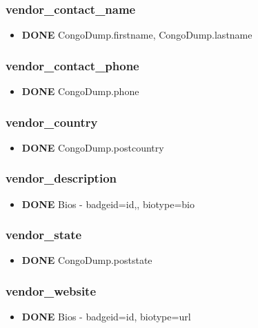 \documentclass[captions=tablesignature]{scrartcl}
\begin{document}
\subsubsection{vendor\_contact\_name}
\label{sec-2-1-6}
\begin{itemize}
\item {\bfseries\sffamily DONE} CongoDump.firstname, CongoDump.lastname
\label{sec-2-1-6-1}
\end{itemize}

\subsubsection{vendor\_contact\_phone}
\label{sec-2-1-7}
\begin{itemize}
\item {\bfseries\sffamily DONE} CongoDump.phone
\label{sec-2-1-7-1}
\end{itemize}

\subsubsection{vendor\_country}
\label{sec-2-1-8}
\begin{itemize}
\item {\bfseries\sffamily DONE} CongoDump.postcountry
\label{sec-2-1-8-1}
\end{itemize}

\subsubsection{vendor\_description}
\label{sec-2-1-9}
\begin{itemize}
\item {\bfseries\sffamily DONE} Bios - badgeid=id,, biotype=bio
\label{sec-2-1-9-1}
\end{itemize}

\subsubsection{vendor\_state}
\label{sec-2-1-10}
\begin{itemize}
\item {\bfseries\sffamily DONE} CongoDump.poststate
\label{sec-2-1-10-1}
\end{itemize}

\subsubsection{vendor\_website}
\label{sec-2-1-11}
\begin{itemize}
\item {\bfseries\sffamily DONE} Bios - badgeid=id, biotype=url
\label{sec-2-1-11-1}
\end{itemize}
\end{document}
